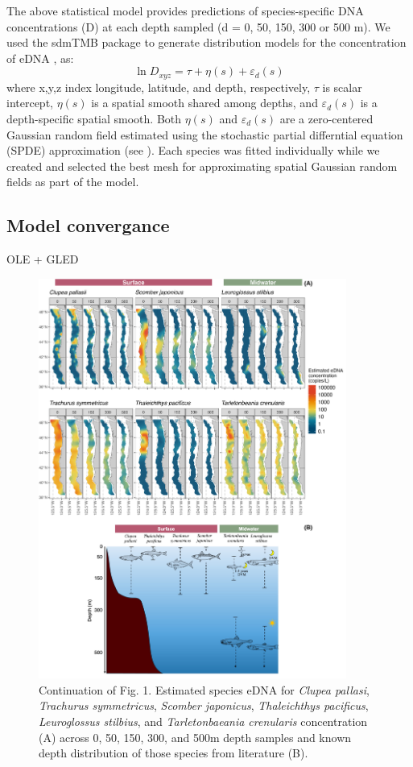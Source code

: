 \documentclass{article}
\begin{document}
The above statistical model provides predictions of species-specific DNA concentrations (D) at each depth sampled (d = 0, 50, 150, 300 or 500 m). We used the sdmTMB package \cite{anderson2022} to generate distribution models for the concentration of eDNA , as:
$$\ln D_{xyz} = \tau + \eta(s) + \varepsilon_{d}(s)$$
where x,y,z index longitude, latitude, and depth, respectively, $\tau$ is scalar intercept, $\eta(s)$ is a spatial smooth shared among depths, and $\varepsilon_d(s)$ is a depth-specific spatial smooth. Both $\eta(s)$ and $\varepsilon_d(s)$ are a zero-centered Gaussian random field estimated using the stochastic partial differntial equation (SPDE) approximation (see \cite{anderson2022}). Each species was fitted individually while we created and selected the best mesh for approximating spatial Gaussian random fields as part of the model.

\subsection*{Model convergance}
OLE + GLED


\begin{figure}
\centering
\includegraphics[width=0.90\textwidth]{plots/5_Supplementary_Figure_1.jpg}
\caption{Continuation of Fig. 1. Estimated species eDNA for \textit{Clupea pallasi}, \textit{Trachurus symmetricus}, \textit{Scomber japonicus}, \textit{Thaleichthys pacificus}, \textit{Leuroglossus stilbius}, and \textit{Tarletonbaeania crenularis} concentration (A) across 0, 50, 150, 300, and 500m depth samples and known depth distribution of those species from literature (B).}
\end{figure}
\end{document}
